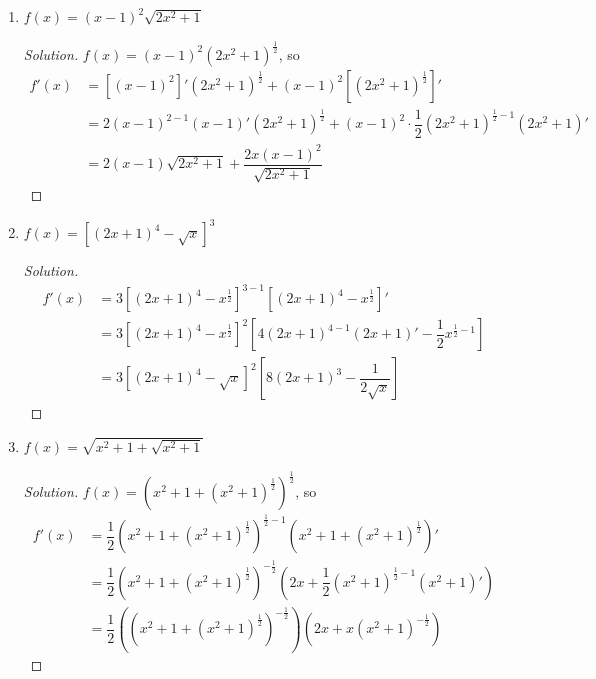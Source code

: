\documentclass[12pt]{article}
\newenvironment{solution}{\begin{proof}[Solution]}{\end{proof}}
\begin{document}
\begin{enumerate}
\begin{enumerate}
\begin{solution}
\begin{align*}
				&=-\dfrac{2025(4x+3)}{(2x^2+3x-1)^{2026}}
			\end{align*}
		\end{solution}
		\item $f(x)=(x-1)^{2}\sqrt{2x^{2}+1}$
		\begin{solution}
			$f(x)=(x-1)^2(2x^2+1)^{\frac{1}{2}}$, so
			\begin{align*}
				f'(x)&=[(x-1)^2]'(2x^2+1)^{\frac{1}{2}}+(x-1)^2[(2x^2+1)^{\frac{1}{2}}]'\\
				&=2(x-1)^{2-1}(x-1)'(2x^2+1)^{\frac{1}{2}}+(x-1)^2\cdot \dfrac{1}{2}(2x^2+1)^{\frac{1}{2}-1}(2x^2+1)'\\
				&=2(x-1)\sqrt{2x^2+1}+\dfrac{2x(x-1)^2}{\sqrt{2x^2+1}}
			\end{align*}
		\end{solution}
		\item $f(x)=[(2x+1)^{4}-\sqrt{x}]^{3}$
		\begin{solution}
			
			\begin{align*}
				f'(x)&=3[(2x+1)^4-x^{\frac{1}{2}}]^{3-1}[(2x+1)^4-x^{\frac{1}{2}}]'\\
				&=3[(2x+1)^4-x^{\frac{1}{2}}]^2[4(2x+1)^{4-1}(2x+1)'-\dfrac{1}{2}x^{\frac{1}{2}-1}]\\
				&=3[(2x+1)^4-\sqrt{x}]^2[8(2x+1)^3-\dfrac{1}{2\sqrt{x}}]
			\end{align*}
			
		\end{solution}
		\item $f(x)=\sqrt{x^2+1+\sqrt{x^2+1}}$
		\begin{solution}
			$f(x)=(x^2+1+(x^2+1)^{\frac{1}{2}})^{\frac{1}{2}}$, so
			\begin{align*}
				f'(x)&=\dfrac{1}{2}(x^2+1+(x^2+1)^{\frac{1}{2}})^{\frac{1}{2}-1}(x^2+1+(x^2+1)^{\frac{1}{2}})'\\
				&=\dfrac{1}{2}(x^2+1+(x^2+1)^{\frac{1}{2}})^{-\frac{1}{2}}(2x+\dfrac{1}{2}(x^2+1)^{\frac{1}{2}-1}(x^2+1)')\\
				&=\dfrac{1}{2}((x^2+1+(x^2+1)^{\frac{1}{2}})^{-\frac{1}{2}})(2x+x(x^2+1)^{-\frac{1}{2}})
			\end{align*}
			

\end{solution}
\end{enumerate}
\end{enumerate}
\end{document}
